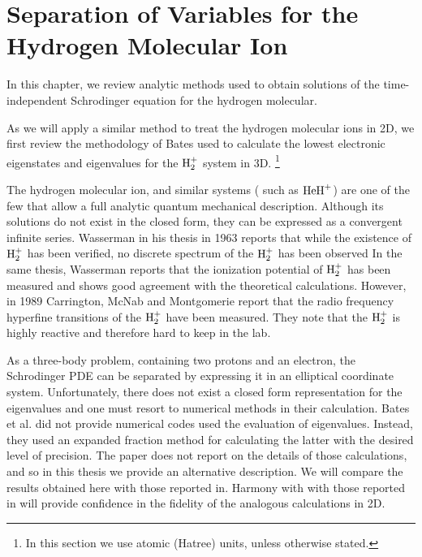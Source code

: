 \chapter{Separation of Variables for the Hydrogen Molecular Ion}

In this chapter, we review analytic methods\cite{Bates1,Bates2,Slater} used to obtain 
solutions of the time-independent Schrodinger equation for 
the hydrogen molecular.

As we will apply a similar method to treat the hydrogen molecular ions in 2D,
we first review the methodology of Bates used to calculate the lowest electronic eigenstates and eigenvalues for the $ {\rm H}_2^{+} $ system in 3D. \footnote {In this section we
use atomic (Hatree) units, unless otherwise stated.}

The hydrogen molecular ion, and similar systems ( such as $ {\rm HeH}^{+} $) are one of the few that allow a full analytic quantum mechanical description. Although its
solutions do not exist in the closed form, they can be expressed as a convergent infinite series.  Wasserman in his thesis \cite{ExperimentalBates2} in 1963 reports that while the existence of $ {\rm H}_2^{+} $ has been verified, no  discrete spectrum of the  $ {\rm H}_2^{+} $ has been observed  In the same thesis, Wasserman reports that the ionization potential of $ {\rm H}_2^{+} $ has been measured and shows good agreement with the theoretical calculations. However, in 1989 Carrington, McNab and Montgomerie report \cite{ExperimentalBates3} that the radio frequency hyperfine transitions of the $ {\rm H}_2^{+} $ have been measured. They note that the $ {\rm H}_2^{+} $  is highly reactive and therefore hard to keep in the lab.

As a three-body problem, containing two protons and an electron,
the Schrodinger PDE can be separated by expressing it in an elliptical coordinate system. Unfortunately, there does not exist a closed form representation for the eigenvalues and one must resort to numerical methods in their calculation.
Bates et al. \cite{Bates1}\cite{Bates2} did not provide numerical codes used the evaluation of eigenvalues. Instead, they used an expanded fraction method for calculating the latter with the desired level of precision. The paper\cite{Bates2} does not report on the details of those calculations, and so in this thesis we provide an alternative description. We will compare
 the results obtained here with those reported in\cite{Bates2}. Harmony with with those reported in\cite{Bates2} will provide 
 confidence in the fidelity of the analogous calculations in 2D.

